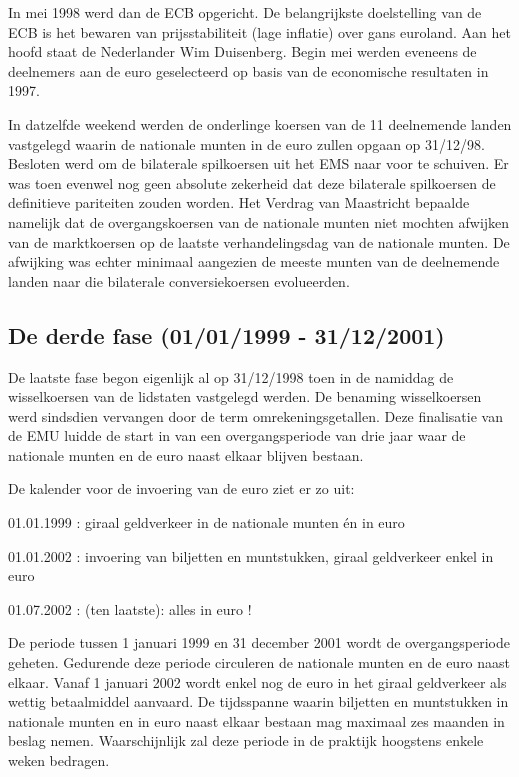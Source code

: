\documentclass[a4paper]{article}
\begin{document}
In mei 1998 werd dan de ECB opgericht. De belangrijkste doelstelling
van de ECB is het bewaren van prijsstabiliteit (lage inflatie) over
gans euroland. Aan het hoofd staat de Nederlander Wim Duisenberg.
Begin mei werden eveneens de deelnemers aan de euro geselecteerd op
basis van de economische resultaten in 1997.

In datzelfde weekend werden de onderlinge koersen van de 11
deelnemende landen vastgelegd waarin de nationale munten in de euro
zullen opgaan op 31/12/98. Besloten werd om de bilaterale
spilkoersen uit het EMS naar voor te schuiven. Er was toen evenwel
nog geen absolute zekerheid dat deze bilaterale spilkoersen de
definitieve pariteiten zouden worden. Het Verdrag van Maastricht
bepaalde namelijk dat de overgangskoersen van de nationale munten
niet mochten afwijken van de marktkoersen op de laatste
verhandelingsdag van de nationale munten. De afwijking was echter
minimaal aangezien de meeste munten van de deelnemende landen naar
die bilaterale conversiekoersen evolueerden.

\subsection{De derde fase (01/01/1999 - 31/12/2001)}

De laatste fase begon eigenlijk al op 31/12/1998 toen in de namiddag
de wisselkoersen van de lidstaten vastgelegd werden. De benaming
wisselkoersen werd sindsdien vervangen door de term
omrekeningsgetallen. Deze finalisatie van de EMU luidde de start in
van een overgangsperiode van drie jaar waar de nationale munten en
de euro naast elkaar blijven bestaan.

De kalender voor de invoering van de euro ziet er zo uit:

01.01.1999 : giraal geldverkeer in de nationale munten \'en in euro

01.01.2002 : invoering van biljetten en muntstukken, giraal geldverkeer
enkel in euro

01.07.2002 :  (ten laatste): alles in euro !

De periode tussen 1 januari 1999 en 31 december 2001 wordt de
overgangsperiode geheten. Gedurende deze periode circuleren de
nationale munten en de euro naast elkaar. Vanaf 1 januari 2002 wordt
enkel nog de euro in het giraal geldverkeer als wettig betaalmiddel
aanvaard. De tijdsspanne waarin biljetten en muntstukken in
nationale munten en in euro naast elkaar bestaan mag maximaal zes
maanden in beslag nemen. Waarschijnlijk zal deze periode in de
praktijk hoogstens enkele weken bedragen.
\end{document}
